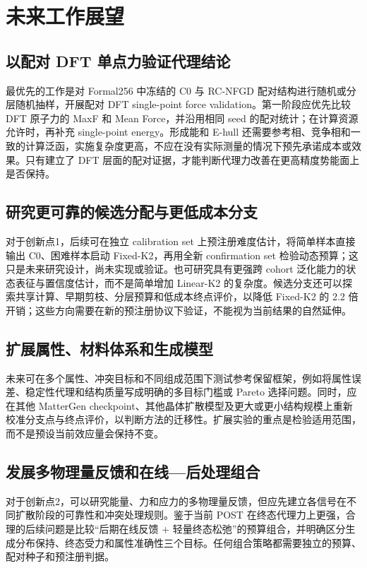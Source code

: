 \section{未来工作展望}

\subsection{以配对 DFT 单点力验证代理结论}

最优先的工作是对 Formal256 中冻结的 C0 与 RC-NFGD 配对结构进行随机或分层随机抽样，开展配对 DFT single-point force validation。第一阶段应优先比较 DFT 原子力的 MaxF 和 Mean Force，并沿用相同 seed 的配对统计；在计算资源允许时，再补充 single-point energy。形成能和 E-hull 还需要参考相、竞争相和一致的计算泛函，实施复杂度更高，不应在没有实际测量的情况下预先承诺成本或效果。只有建立了 DFT 层面的配对证据，才能判断代理力改善在更高精度势能面上是否保持。

\subsection{研究更可靠的候选分配与更低成本分支}

对于创新点1，后续可在独立 calibration set 上预注册难度估计，将简单样本直接输出 C0、困难样本启动 Fixed-K2，再用全新 confirmation set 检验动态预算；这只是未来研究设计，尚未实现或验证。也可研究具有更强跨 cohort 泛化能力的状态表征与置信度估计，而不是简单增加 Linear-K2 的复杂度。候选分支还可以探索共享计算、早期剪枝、分层预算和低成本终点评价，以降低 Fixed-K2 的 2.2 倍开销；这些方向需要在新的预注册协议下验证，不能视为当前结果的自然延伸。

\subsection{扩展属性、材料体系和生成模型}

未来可在多个属性、冲突目标和不同组成范围下测试参考保留框架，例如将属性误差、稳定性代理和结构质量写成明确的多目标门槛或 Pareto 选择问题。同时，应在其他 MatterGen checkpoint、其他晶体扩散模型及更大或更小结构规模上重新校准分支点与终点评价，以判断方法的迁移性。扩展实验的重点是检验适用范围，而不是预设当前效应量会保持不变。

\subsection{发展多物理量反馈和在线---后处理组合}

对于创新点2，可以研究能量、力和应力的多物理量反馈，但应先建立各信号在不同扩散阶段的可靠性和冲突处理规则。鉴于当前 POST 在终态代理力上更强，合理的后续问题是比较``后期在线反馈 + 轻量终态松弛''的预算组合，并明确区分生成分布保持、终态受力和属性准确性三个目标。任何组合策略都需要独立的预算、配对种子和预注册判据。


